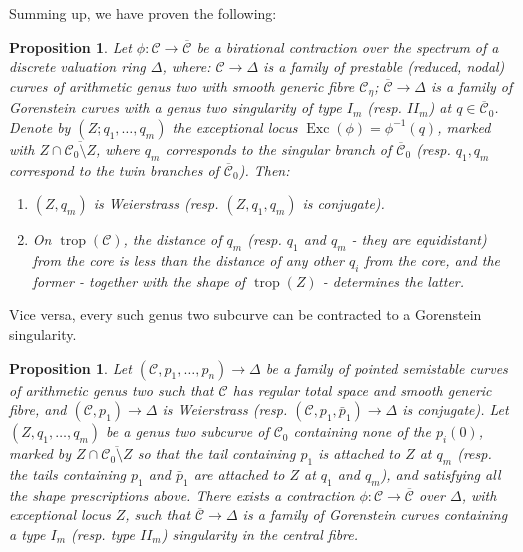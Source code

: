 \documentclass{compositio}
\renewcommand{\to}{\rightarrow}
\newcommand{\dvr}{\Delta}
\newcommand{\Exc}{\operatorname{Exc}}
\theoremstyle{plain}
\newtheorem{prop}[thm]{Proposition}
\theoremstyle{definition}
\theoremstyle{remark}
\begin{document}
 Summing up, we have proven the following:

\begin{prop}\label{prop:tailI}
 Let $\phi\colon\mathcal C\to\overline{\mathcal C}$ be a birational contraction over the spectrum of a discrete valuation ring $\dvr$, where: $\mathcal C\to \dvr$ is a family of prestable (reduced, nodal) curves of arithmetic genus two with smooth generic fibre $\mathcal C_{\eta}$; $\overline{\mathcal C}\to\dvr$ is a family of Gorenstein curves with a genus two singularity of type $I_m$ (resp. $I\!I_m$) at $q\in\overline{\mathcal C}_0$. Denote by $(Z;q_1,\ldots,q_m)$ the exceptional locus $\Exc(\phi)=\phi^{-1}(q)$, marked with $Z\cap\overline{\mathcal C_0\setminus Z}$, where $q_m$ corresponds to the singular branch of $\overline{\mathcal C}_0$ (resp. $q_1,q_m$ correspond to the twin branches of $\overline{\mathcal C}_0$). Then:
 \begin{enumerate}[leftmargin=.6cm]
  \item $(Z,q_m)$ is Weierstrass (resp. $(Z,q_1,q_m)$ is conjugate).
  \item On $\operatorname{trop}(\mathcal C)$, the distance of $q_m$ (resp. $q_1$ and $q_m$ - they are equidistant) from the core is less than the distance of any other $q_i$ from the core, and the former - together with the shape of $\operatorname{trop}(Z)$ - determines the latter.
 \end{enumerate}
\end{prop}

Vice versa, every such genus two subcurve can be contracted to a Gorenstein singularity.

\begin{prop}\label{prop:contractionI}
 Let $(\mathcal C,p_1,\ldots,p_n)\to\dvr$ be a family of pointed semistable curves of arithmetic genus two such that $\mathcal C$ has regular total space and smooth generic fibre, and $(\mathcal C,p_1)\to \Delta$ is Weierstrass (resp. $(\mathcal C,p_1,\bar p_1)\to \Delta$ is conjugate). Let $(Z,q_1,\ldots,q_m)$ be a genus two subcurve of $\mathcal C_0$ containing none of the $p_i(0)$, marked by $Z\cap \overline{\mathcal C_0\setminus Z}$ so that the tail containing $p_1$ is attached to $Z$ at $q_m$ (resp. the tails containing $p_1$ and $\bar p_1$ are attached to $Z$ at $q_1$ and $q_m$), and satisfying all the shape prescriptions above. There exists a contraction $\phi\colon\mathcal C\to\overline{\mathcal C}$ over $\dvr$, with exceptional locus $Z$, such that $\overline{\mathcal C}\to\dvr$ is a family of Gorenstein curves containing a type $I_m$ (resp. type $I\!I_m$) singularity in the central fibre.
\end{prop}
\end{document}

